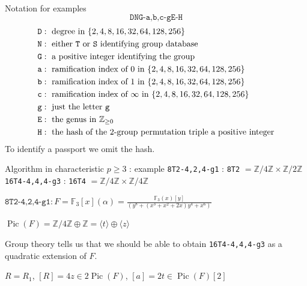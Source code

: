 \documentclass[handout,xcolor=dvipsnames]{beamer}
\theoremstyle{plain}
\newcommand{\ZZ}{\mathbb Z}
\newcommand{\FF}{\mathbb{F}}
\DeclareMathOperator{\Pic}{Pic}
\begin{document}
{    \begin{frame}{Notation for examples}
      \begin{equation*}
        \texttt{DNG-a,b,c-gE-H}
      \end{equation*}
      \begin{align*}
        \texttt{D} &:\text{ degree in }
        \{2,4,8,16,32,64,128,256\}\\
        \texttt{N} &:\text{ either \texttt{T}
        or \texttt{S} identifying group
        database}\\
        \texttt{G} &:\text{ a positive integer
        identifying the group}\\
        \texttt{a} &:\text{ ramification index
        of $0$ in }
        \{2,4,8,16,32,64,128,256\}\\
        \texttt{b} &:\text{ ramification index
        of $1$ in }
        \{2,4,8,16,32,64,128,256\}\\
        \texttt{c} &:\text{ ramification index
        of $\infty$ in }
        \{2,4,8,16,32,64,128,256\}\\
        \texttt{g} &:\text{ just the letter 
        \texttt{g}}\\
        \texttt{E} &:\text{ the genus in }
        \ZZ_{\geq 0}\\
        \texttt{H} &:\text{ the hash
        of the $2$-group permutation triple 
        a positive integer}
      \end{align*}
      \pause
      To identify a passport we omit the hash.
    \end{frame}
    \begin{frame}{Algorithm in characteristic $p\geq 3$ : example}
      \texttt{8T2-4,2,4-g1} : \texttt{8T2} $=\ZZ/4\ZZ\times\ZZ/2\ZZ$
      \newline
      \texttt{16T4-4,4,4-g3} : \texttt{16T4} $=\ZZ/4\ZZ\times\ZZ/4\ZZ$
      \pause\par
      $\texttt{8T2-4,2,4-g1} : F = \FF_3[x](\alpha)=\frac{\FF_3(x)[y]}{(y^8 + (x^3 + x^2 + 2x)y^4 + x^6)}$
      \pause\par
      $\Pic(F) = \ZZ/4\ZZ\oplus\ZZ =
      \langle t\rangle\oplus\langle z\rangle$
      \pause\par
      Group theory tells us that we should be able to obtain
      \texttt{16T4-4,4,4-g3} as a quadratic extension
      of $F$.
      \pause\par
      $R = R_1$, $[R] = 4z\in 2\Pic(F)$, $[a]=2t\in\Pic(F)[2]$

\end{frame}}
\end{document}
